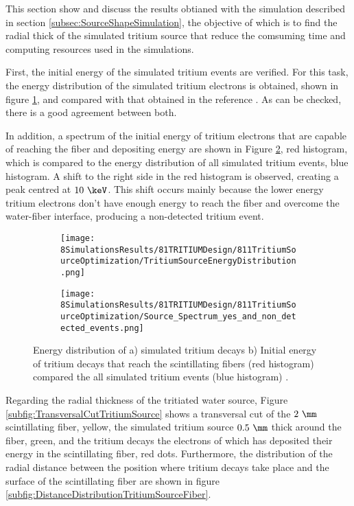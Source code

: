 This section show and discuss the results obtianed with the simulation described in section \ref{subsec:SourceShapeSimulation}, the objective of which is to find the radial thick of the simulated tritium source that reduce the comsuming time and computing resources used in the simulations. 

First, the initial energy of the simulated tritium events are verified. For this task, the energy distribution of the simulated tritium electrons is obtained, shown in figure \ref{subfig:EnergyDistributionTritiumSource}, and compared with that obtained in the reference \cite{TritiumEmissionSpectrum}. As can be checked, there is a good agreement between both.

In addition, a spectrum of the initial energy of tritium electrons that are capable of reaching the fiber and depositing energy are shown in Figure \ref{subfig:EnergySpectrumEventsDetectedandNonDetected}, red histogram, which is compared to the energy distribution of all simulated tritium events, blue histogram. A shift to the right side in the red histogram is observed, creating a peak centred at $10~\keV$. This shift occurs mainly because the lower energy tritium electrons don't have enough energy to reach the fiber and overcome the water-fiber interface, producing a non-detected tritium event.

\begin{figure}
\centering
    \begin{subfigure}[b]{0.45\textwidth}
    \centering
    \texttt{[image: 8SimulationsResults/81TRITIUMDesign/811TritiumSourceOptimization/TritiumSourceEnergyDistribution.png]}  
    \caption{\label{subfig:EnergyDistributionTritiumSource}}
    \end{subfigure}
    \hfill
    \begin{subfigure}[b]{0.45\textwidth}
    \centering
    \texttt{[image: 8SimulationsResults/81TRITIUMDesign/811TritiumSourceOptimization/Source\_Spectrum\_yes\_and\_non\_detected\_events.png]}  
    \caption{\label{subfig:EnergySpectrumEventsDetectedandNonDetected}}
    \end{subfigure}
 \caption{Energy distribution of a) simulated tritium decays b) Initial energy of tritium decays that reach the scintillating fibers (red histogram) compared the all simulated tritium events (blue histogram) \cite{SimulationPaperCarlos}.
 \label{fig:TritiumSourceOptimization}}
\end{figure}

Regarding the radial thickness of the tritiated water source, Figure \ref{subfig:TransversalCutTritiumSource} shows a transversal cut of the $2~\mm$ scintillating fiber, yellow, the simulated tritium source $0.5~\mm$ thick around the fiber, green, and the tritium decays the electrons of which has deposited their energy in the scintillating fiber, red dots. Furthermore, the distribution of the radial distance between the position where tritium decays take place and the surface of the scintillating fiber are shown in figure \ref{subfig:DistanceDistributionTritiumSourceFiber}.

